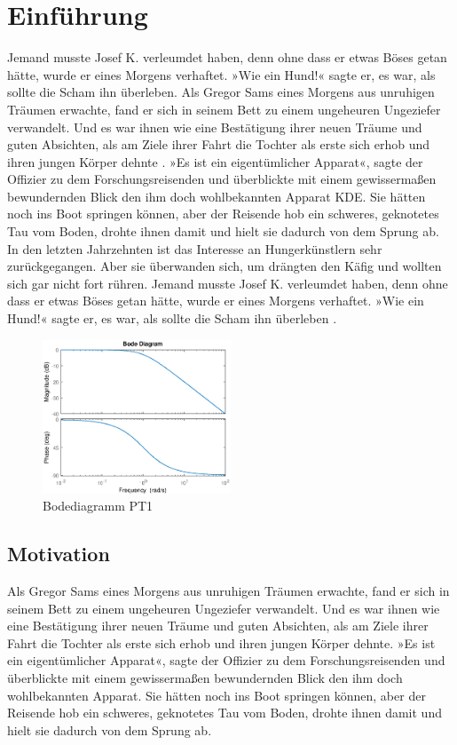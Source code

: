
\section{Einführung}
Jemand musste Josef K. verleumdet haben, denn ohne dass er etwas Böses getan hätte, wurde er eines Morgens verhaftet. »Wie ein Hund!« sagte er, es war, als sollte die Scham ihn überleben. Als Gregor Sams eines Morgens aus unruhigen Träumen erwachte, fand er sich in seinem Bett zu einem ungeheuren Ungeziefer  verwandelt. Und es war ihnen wie eine Bestätigung ihrer neuen Träume und guten Absichten, als am Ziele ihrer Fahrt die Tochter als erste sich erhob und ihren jungen Körper dehnte \cite[S.55ff]{Accardi.2010}. »Es ist ein eigentümlicher Apparat«, sagte der Offizier zu dem Forschungsreisenden und überblickte mit einem gewissermaßen bewundernden Blick den ihm doch wohlbekannten Apparat \ac{KDE}. Sie hätten noch ins Boot springen können, aber der Reisende hob ein schweres, geknotetes Tau vom Boden, drohte ihnen damit und hielt sie dadurch von dem Sprung ab. In den letzten Jahrzehnten ist das Interesse an Hungerkünstlern sehr zurückgegangen. Aber sie überwanden sich, um drängten den Käfig und wollten sich gar nicht fort rühren. Jemand musste Josef K. verleumdet haben, denn ohne dass er etwas Böses getan hätte, wurde er eines Morgens verhaftet. »Wie ein Hund!« sagte er, es war, als sollte die Scham ihn überleben \cite{Lewis.2010}.

\begin{figure}[h]
\centering \includegraphics[width=0.5\textwidth]{Bilder/PT1/PT1.eps}
\caption{Bodediagramm PT1}
\end{figure}

\subsection{Motivation}
Als Gregor Sams eines Morgens aus unruhigen Träumen erwachte, fand er sich in seinem Bett zu einem ungeheuren Ungeziefer verwandelt. Und es war ihnen wie eine Bestätigung ihrer neuen Träume und guten Absichten, als am Ziele ihrer Fahrt die Tochter als erste sich erhob und ihren jungen Körper dehnte. »Es ist ein eigentümlicher Apparat«, sagte der Offizier zu dem Forschungsreisenden und überblickte mit einem gewissermaßen bewundernden Blick den ihm doch wohlbekannten Apparat. Sie hätten noch ins Boot springen können, aber der Reisende hob ein schweres, geknotetes Tau vom Boden, drohte ihnen damit und hielt sie dadurch von dem Sprung ab.

